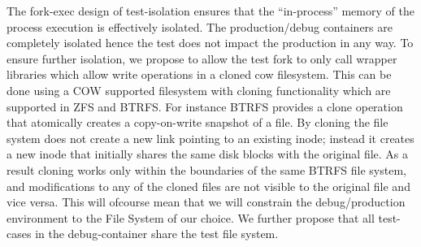 The fork-exec design of test-isolation ensures that the ``in-process'' memory of the process execution is effectively isolated. 
The production/debug containers are completely isolated hence the test does not impact the production in any way. 
To ensure further isolation, we propose to allow the test fork to only call wrapper libraries which allow write operations in a cloned cow filesystem.
This can be done using a COW supported filesystem with cloning functionality which are supported in ZFS and BTRFS.
For instance BTRFS provides a clone operation that atomically creates a copy-on-write snapshot of a file. By cloning the file system does not create a new link pointing to an existing inode; instead it creates a new inode that initially shares the same disk blocks with the original file. As a result cloning works only within the boundaries of the same BTRFS file system, and modifications to any of the cloned files are not visible to the original file and vice versa. 
This will ofcourse mean that we will constrain the debug/production environment to the File System of our choice.
We further propose that all test-cases in the debug-container share the test file system.

